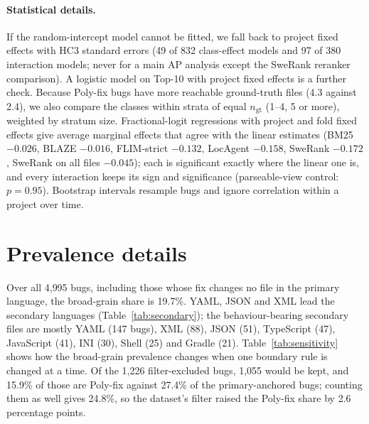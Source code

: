 \documentclass[10pt,a4paper]{article}
\begin{document}
\paragraph{Statistical details.} If the random-intercept model cannot be
fitted, we fall back to project fixed effects with HC3 standard errors (49 of
832 class-effect models and 97 of 380 interaction models; never for a main AP
analysis except the SweRank reranker comparison). A logistic model on Top-10
with project fixed effects is a further check. Because Poly-fix bugs have more
reachable ground-truth files (4.3 against 2.4), we also compare the classes
within strata of equal $n_{\mathrm{gt}}$ (1--4, 5 or more), weighted by stratum
size. Fractional-logit regressions with project and fold fixed effects give
average marginal effects that agree with the linear estimates (BM25 $-0.026$,
BLAZE $-0.016$, FLIM-strict $-0.132$, LocAgent $-0.158$, SweRank $-0.172$,
SweRank on all files $-0.045$); each is significant exactly where the linear one
is, and every interaction keeps its sign and significance (parseable-view
control: $p=0.95$). Bootstrap intervals resample bugs and ignore correlation
within a project over time.

\section{Prevalence details}\label{app:rq1}

Over all 4{,}995 bugs, including those whose fix changes no file in the primary
language, the broad-grain share is 19.7\%. YAML, JSON and XML lead the
secondary languages (Table~\ref{tab:secondary}); the behaviour-bearing secondary
files are mostly YAML (147 bugs), XML (88), JSON (51), TypeScript (47),
JavaScript (41), INI (30), Shell (25) and Gradle (21).
Table~\ref{tab:sensitivity} shows how the broad-grain prevalence changes when
one boundary rule is changed at a time. Of the 1{,}226 filter-excluded bugs,
1{,}055 would be kept, and 15.9\% of those are Poly-fix against 27.4\% of the
primary-anchored bugs; counting them as well gives 24.8\%, so the dataset's
filter raised the Poly-fix share by 2.6 percentage points.



\end{document}
